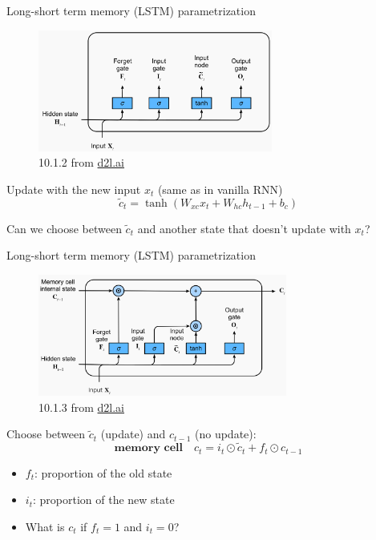 \documentclass[usenames,dvipsnames,notes,11pt,aspectratio=169,hyperref={colorlinks=true, linkcolor=blue}]{beamer}
\begin{document}
\begin{frame}
    {Long-short term memory (LSTM) parametrization}
    \begin{figure}
        \includegraphics[height=4cm]{figures/lstm-1}
        \caption{10.1.2 from \href{https://d2l.ai/chapter_recurrent-modern/lstm.html}{d2l.ai}}
    \end{figure}

    Update with the new input $x_t$ (same as in vanilla RNN)
    $$
    \tilde{c}_t = \tanh(W_{xc}x_t + W_{hc}h_{t-1} + b_c)
    $$

    \pause\vspace{-1ex}
    Can we choose between $\tilde{c}_t$ and another state that doesn't update with $x_t$?
\end{frame}

\begin{frame}
    {Long-short term memory (LSTM) parametrization}
    \begin{figure}
        \includegraphics[height=4cm]{figures/lstm-2}
        \caption{10.1.3 from \href{https://d2l.ai/chapter_recurrent-modern/lstm.html}{d2l.ai}}
    \end{figure}

    Choose between $\tilde{c}_t$ (update) and $c_{t-1}$ (no update): 
    $$
    \textbf{memory cell} \quad
    c_t = i_t \odot \tilde{c}_t + f_t \odot c_{t-1}
    $$

    \vspace{-1ex}
    \begin{itemize}
        \item $f_t$: proportion of the old state
        \item $i_t$: proportion of the new state
        \item What is $c_t$ if $f_t=1$ and $i_t=0$?
    \end{itemize}
\end{frame}
\end{document}

